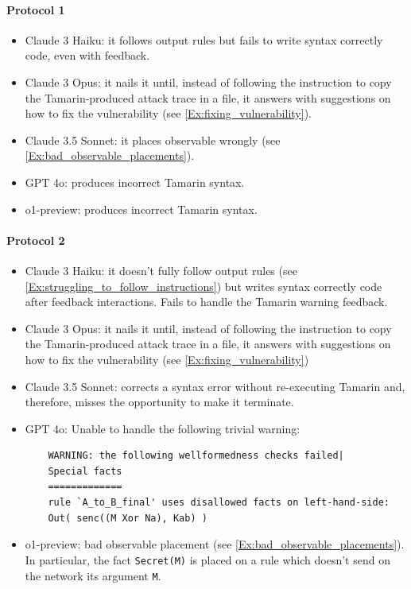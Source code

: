 \paragraph{Protocol 1}
\begin{itemize}
    \item Claude 3 Haiku: it follows output rules but fails to write syntax correctly code, even with feedback.
    \item Claude 3 Opus: it nails it until, instead of following the instruction to copy the Tamarin-produced attack trace in a file, it answers with suggestions on how to fix the vulnerability (see \ref{Ex:fixing_vulnerability}).
    \item Claude 3.5 Sonnet: it places observable wrongly (see \ref{Ex:bad_observable_placements}).
    \item GPT 4o: produces incorrect Tamarin syntax.
    \item o1-preview: produces incorrect Tamarin syntax.
\end{itemize}

\paragraph{Protocol 2}
\begin{itemize}
    \item Claude 3 Haiku: it doesn't fully follow output rules (see \ref{Ex:struggling_to_follow_instructions}) but writes syntax correctly code after feedback interactions. Fails to handle the Tamarin warning feedback.
    \item Claude 3 Opus: it nails it until, instead of following the instruction to copy the Tamarin-produced attack trace in a file, it answers with suggestions on how to fix the vulnerability (see \ref{Ex:fixing_vulnerability})
    \item Claude 3.5 Sonnet: corrects a syntax error without re-executing Tamarin and, therefore, misses the opportunity to make it terminate.
    \item GPT 4o: Unable to handle the following trivial warning: \begin{verbatim}
    WARNING: the following wellformedness checks failed|
    Special facts
    =============
    rule `A_to_B_final' uses disallowed facts on left-hand-side:
    Out( senc((M Xor Na), Kab) )
    \end{verbatim}
    \item o1-preview: bad observable placement (see \ref{Ex:bad_observable_placements}). In particular, the fact \texttt{Secret(M)} is placed on a rule which doesn't send on the network its argument \texttt{M}.
\end{itemize}


